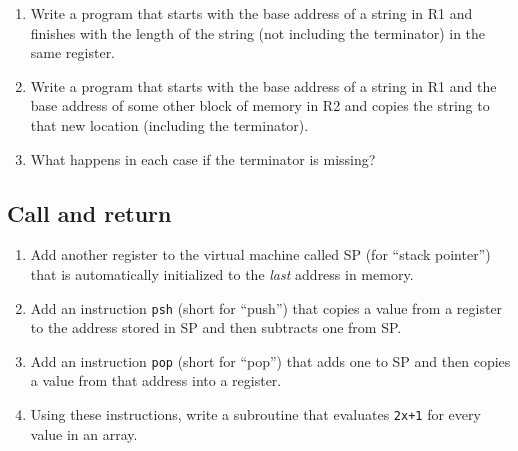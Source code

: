 \documentclass[krantzl]{krantz}
\begin{document}
\begin{enumerate}

\item 

Write a program that starts with the base address of a string in R1
    and finishes with the length of the string (not including the terminator) in the same register.



\item 

Write a program that starts with the base address of a string in R1
    and the base address of some other block of memory in R2
    and copies the string to that new location (including the terminator).



\item 

What happens in each case if the terminator is missing?



\end{enumerate}

\subsection*{Call and return}

\begin{enumerate}

\item 

Add another register to the virtual machine called SP (for “stack pointer”)
    that is automatically initialized to the \emph{last} address in memory.



\item 

Add an instruction \texttt{psh} (short for “push”) that copies a value from a register
    to the address stored in SP and then subtracts one from SP.



\item 

Add an instruction \texttt{pop} (short for “pop”) that adds one to SP
    and then copies a value from that address into a register.



\item 

Using these instructions,
    write a subroutine that evaluates \texttt{2x+1} for every value in an array.



\end{enumerate}
\end{document}
